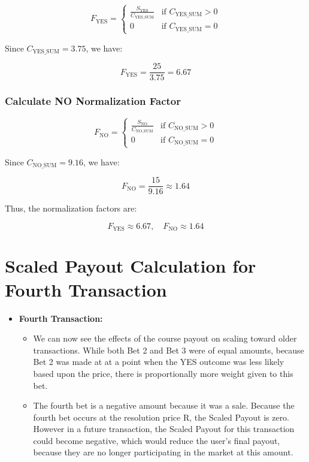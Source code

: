 \documentclass{article}
\begin{document}
\[
F_{\text{YES}} =
\begin{cases}
      \frac{S_{\text{YES}}}{C_{\text{YES\_SUM}}} & \text{if } C_{\text{YES\_SUM}} > 0 \\
      0 & \text{if } C_{\text{YES\_SUM}} = 0
   \end{cases}
\]

Since \( C_{\text{YES\_SUM}} = 3.75 \), we have:

\[
F_{\text{YES}} = \frac{25}{3.75} = 6.67
\]

\subsubsection*{Calculate NO Normalization Factor}

\[
F_{\text{NO}} =
\begin{cases}
      \frac{S_{\text{NO}}}{C_{\text{NO\_SUM}}} & \text{if } C_{\text{NO\_SUM}} > 0 \\
      0 & \text{if } C_{\text{NO\_SUM}} = 0
   \end{cases}
\]

Since \( C_{\text{NO\_SUM}} = 9.16 \), we have:

\[
F_{\text{NO}} = \frac{15}{9.16} \approx 1.64
\]

Thus, the normalization factors are:

\[
F_{\text{YES}} \approx 6.67, \quad F_{\text{NO}} \approx 1.64
\]


\section*{Scaled Payout Calculation for Fourth Transaction}

\begin{itemize}
    \item \textbf{Fourth Transaction:}
    \begin{itemize}
        \item We can now see the effects of the course payout on scaling toward older transactions. While both Bet 2 and Bet 3 were of equal amounts, because Bet 2 was made at at a point when the YES outcome was less likely based upon the price, there is proportionally more weight given to this bet.
        \item The fourth bet is a negative amount because it was a sale. Because the fourth bet occurs at the resolution price R, the Scaled Payout is zero. However in a future transaction, the Scaled Payout for this transaction could become negative, which would reduce the user's final payout, because they are no longer participating in the market at this amount.
    \end{itemize}
\end{itemize}
\end{document}

